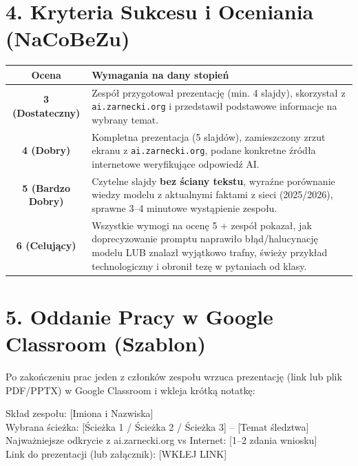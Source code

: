 \documentclass[11pt,a4paper]{article}
\begin{document}
\section{4. Kryteria Sukcesu i Oceniania (NaCoBeZu)}

\begin{center}
\begin{tabularx}{\textwidth}{@{} c X @{}}
\toprule
\textbf{Ocena} & \textbf{Wymagania na dany stopień} \\
\midrule
\textbf{3 (Dostateczny)} & Zespół przygotował prezentację (min. 4 slajdy), skorzystał z \texttt{ai.zarnecki.org} i przedstawił podstawowe informacje na wybrany temat. \\
\midrule
\textbf{4 (Dobry)} & Kompletna prezentacja (5 slajdów), zamieszczony zrzut ekranu z \texttt{ai.zarnecki.org}, podane konkretne źródła internetowe weryfikujące odpowiedź AI. \\
\midrule
\textbf{5 (Bardzo Dobry)} & Czytelne slajdy \textbf{bez ściany tekstu}, wyraźne porównanie wiedzy modelu z aktualnymi faktami z sieci (2025/2026), sprawne 3--4 minutowe wystąpienie zespołu. \\
\midrule
\textbf{6 (Celujący)} & Wszystkie wymogi na ocenę 5 + zespół pokazał, jak doprecyzowanie promptu naprawiło błąd/halucynację modelu LUB znalazł wyjątkowo trafny, świeży przykład technologiczny i obronił tezę w pytaniach od klasy. \\
\bottomrule
\end{tabularx}
\end{center}

\section{5. Oddanie Pracy w Google Classroom (Szablon)}

Po zakończeniu prac jeden z członków zespołu wrzuca prezentację (link lub plik PDF/PPTX) w Google Classroom i wkleja krótką notatkę:

\begin{tcolorbox}[colback=gray!6!white, colframe=gray!50!black, boxrule=0.6pt, arc=2pt]
\ttfamily\small
Skład zespołu: [Imiona i Nazwiska]\\
Wybrana ścieżka: [Ścieżka 1 / Ścieżka 2 / Ścieżka 3] -- [Temat śledztwa]\\
Najważniejsze odkrycie z ai.zarnecki.org vs Internet: [1--2 zdania wniosku]\\
Link do prezentacji (lub załącznik): [WKLEJ LINK]
\end{tcolorbox}
\end{document}
